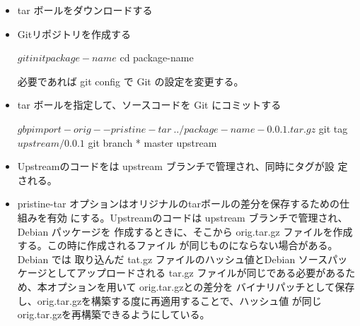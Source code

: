 \begin{frame}[containsverbatim]
\begin{itemize}
\item tar ボールをダウンロードする


\item Gitリポジトリを作成する

\begin{commandline}
$ git init package-name
$ cd package-name
\end{commandline}

必要であれば git config で Git の設定を変更する。
\end{itemize}
\end{frame}

\begin{frame}[containsverbatim]
\begin{itemize}
\item tar ボールを指定して、ソースコードを Git にコミットする

\begin{commandline}
$ gbp import-orig --pristine-tar \
	../package-name-0.0.1.tar.gz
$ git tag 
$ upstream/0.0.1
$ git branch
* master
  upstream
\end{commandline}
\end{itemize}
\end{frame}

\begin{frame}[containsverbatim]
\begin{itemize}
\item Upstreamのコードをは upstream ブランチで管理され、同時にタグが設
定される。
\item pristine-tar オプションはオリジナルのtarボールの差分を保存するための仕組みを有効
にする。Upstreamのコードは upstream ブランチで管理され、Debian パッケージを
作成するときに、そこから orig.tar.gz ファイルを作成する。この時に作成されるファイル
が同じものにならない場合がある。Debian では
取り込んだ tat.gz ファイルのハッシュ値とDebian ソースパッケージとしてアップロードされる
tar.gz ファイルが同じである必要があるため、本オプションを用いて orig.tar.gzとの差分を
バイナリパッチとして保存し、orig.tar.gzを構築する度に再適用することで、ハッシュ値
が同じorig.tar.gzを再構築できるようにしている。
\end{itemize}
\end{frame}

